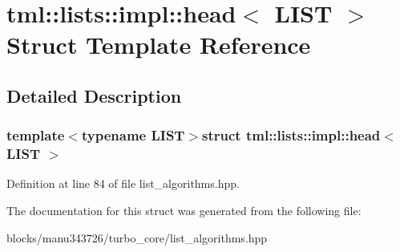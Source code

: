 \hypertarget{structtml_1_1lists_1_1impl_1_1head}{\section{tml\+:\+:lists\+:\+:impl\+:\+:head$<$ L\+I\+S\+T $>$ Struct Template Reference}
\label{structtml_1_1lists_1_1impl_1_1head}
}


\subsection{Detailed Description}
\subsubsection*{template$<$typename L\+I\+S\+T$>$struct tml\+::lists\+::impl\+::head$<$ L\+I\+S\+T $>$}



Definition at line 84 of file list\+\_\+algorithms.\+hpp.



The documentation for this struct was generated from the following file\+:\begin{DoxyCompactItemize}
\item 
blocks/manu343726/turbo\+\_\+core/list\+\_\+algorithms.\+hpp\end{DoxyCompactItemize}
